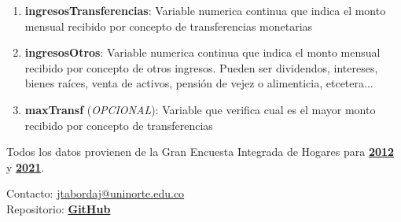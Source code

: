 \documentclass[12pt,a4paper]{article}
\begin{document}
\begin{enumerate}
		\item \textbf{ingresosTransferencias}: Variable numerica continua que indica el monto mensual recibido por concepto de transferencias monetarias
		\item \textbf{ingresosOtros}: Variable numerica continua que indica el monto mensual recibido por concepto de otros ingresos. Pueden ser dividendos, intereses, bienes raíces, venta de activos, pensión de vejez o alimenticia, etcetera...
		\item \textbf{maxTransf} (\textit{OPCIONAL}): Variable que verifica cual es el mayor monto recibido por concepto de transferencias
\end{enumerate}

Todos los datos provienen de la Gran Encuesta Integrada de Hogares para \textbf{\href{https://microdatos.dane.gov.co/index.php/catalog/77/study-description}{2012}} y  \textbf{\href{https://microdatos.dane.gov.co/index.php/catalog/701/study-description}{2021}}.

\vfill

\noindent Contacto: \href{mailto:jtabordaj@uninorte.edu.co}{jtabordaj@uninorte.edu.co} \\
Repositorio: \textbf{\href{https://github.com/jtabordaj/research_perilla}{GitHub}}
\end{document}
